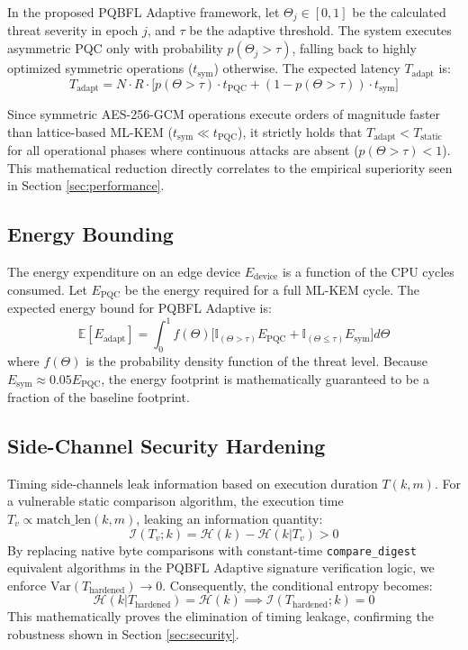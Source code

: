 \documentclass[journal, 10pt]{IEEEtran}
\begin{document}
In the proposed PQBFL Adaptive framework, let $\Theta_j \in [0, 1]$ be the calculated threat severity in epoch $j$, and $\tau$ be the adaptive threshold. The system executes asymmetric PQC only with probability $p(\Theta_j > \tau)$, falling back to highly optimized symmetric operations ($t_{\text{sym}}$) otherwise. The expected latency $T_{\text{adapt}}$ is:
\begin{equation}
T_{\text{adapt}} = N \cdot R \cdot \Big[ p(\Theta > \tau) \cdot t_{\text{PQC}} + (1 - p(\Theta > \tau)) \cdot t_{\text{sym}} \Big]
\end{equation}

Since symmetric AES-256-GCM operations execute orders of magnitude faster than lattice-based ML-KEM ($t_{\text{sym}} \ll t_{\text{PQC}}$), it strictly holds that $T_{\text{adapt}} < T_{\text{static}}$ for all operational phases where continuous attacks are absent ($p(\Theta > \tau) < 1$). This mathematical reduction directly correlates to the empirical superiority seen in Section \ref{sec:performance}.

\subsection{Energy Bounding}
The energy expenditure on an edge device $E_{\text{device}}$ is a function of the CPU cycles consumed. Let $E_{\text{PQC}}$ be the energy required for a full ML-KEM cycle. The expected energy bound for PQBFL Adaptive is:
\begin{equation}
\mathbb{E}[E_{\text{adapt}}] = \int_{0}^{1} f(\Theta) \Big[ \mathbb{I}_{(\Theta > \tau)} E_{\text{PQC}} + \mathbb{I}_{(\Theta \leq \tau)} E_{\text{sym}} \Big] d\Theta
\end{equation}
where $f(\Theta)$ is the probability density function of the threat level. Because $E_{\text{sym}} \approx 0.05 E_{\text{PQC}}$, the energy footprint is mathematically guaranteed to be a fraction of the baseline footprint.

\subsection{Side-Channel Security Hardening}
Timing side-channels leak information based on execution duration $T(k, m)$. For a vulnerable static comparison algorithm, the execution time $T_v \propto \text{match\_len}(k, m)$, leaking an information quantity:
\begin{equation}
\mathcal{I}(T_v; k) = \mathcal{H}(k) - \mathcal{H}(k | T_v) > 0
\end{equation}
By replacing native byte comparisons with constant-time \texttt{compare\_digest} equivalent algorithms in the PQBFL Adaptive signature verification logic, we enforce $\text{Var}(T_{\text{hardened}}) \to 0$. Consequently, the conditional entropy becomes:
\begin{equation}
\mathcal{H}(k | T_{\text{hardened}}) = \mathcal{H}(k) \implies \mathcal{I}(T_{\text{hardened}}; k) = 0
\end{equation}
This mathematically proves the elimination of timing leakage, confirming the robustness shown in Section \ref{sec:security}.
\end{document}
